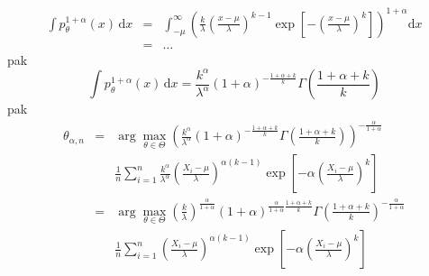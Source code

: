 \documentclass[11pt]{article}
\newcommand{\intpa}{\int p_\theta^{1+\alpha}(x) \, \mathrm{d}x }
\newcommand{\amtiT}{\arg \max_{\theta \in \Theta}}
\newcommand{\fa}{\frac{\alpha}{1+\alpha}}
\begin{document}
\begin{eqnarray}
\intpa & = & \int_{-\mu }^{\infty } \left( \frac{k}{\lambda} \left( \frac{x-\mu}{\lambda} \right)^{k-1} \exp \left[ -\left( \frac{x-\mu}{\lambda} \right)^k \right] \right)^{1+\alpha} \mathrm{d}x \nonumber\\
& = & \ldots \nonumber
\end{eqnarray} 
pak
\begin{equation}
\intpa = \frac{k^\alpha}{\lambda^\alpha}(1+\alpha)^{-\frac{1+\alpha +k}{k}} \Gamma \left( \frac{1+\alpha +k}{k}\right)
\end{equation}
pak
\begin{eqnarray}
\theta_{\alpha,n} & = & \amtiT \left(\frac{k^\alpha}{\lambda^\alpha}(1+\alpha)^{-\frac{1+\alpha+k}{k}} \Gamma \left(\frac{1+\alpha+k}{k}\right) \right)^{-\fa} \nonumber \\
&&  \frac{1}{n} \sum_{i=1}^n \frac{k^\alpha}{\lambda^\alpha} \left( \frac{X_i-\mu}{\lambda}\right)^{\alpha(k-1)} \exp \left[-\alpha \left(\frac{X_i-\mu}{\lambda}\right)^k \right] \nonumber \\
& = & \amtiT \left( \frac{k}{\lambda} \right)^\fa (1+\alpha)^{\fa\frac{1+\alpha+k}{k}} \Gamma\left(\frac{1+\alpha+k}{k}\right)^{-\fa} \nonumber\\
&& \frac{1}{n}\sum_{i=1}^n \left( \frac{X_i-\mu}{\lambda}\right)^{\alpha(k-1)} \exp\left[-\alpha \left(\frac{X_i-\mu}{\lambda}\right)^k\right]
\end{eqnarray}
\end{document}
